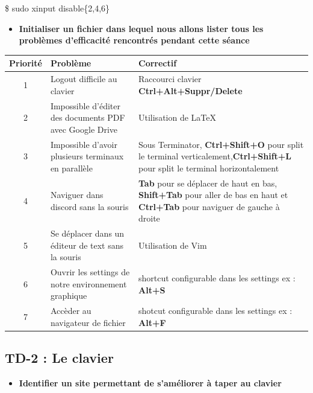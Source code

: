 \documentclass[12pt]{article}
\begin{document}
  \vspace{0.3cm}
  \$ sudo xinput disable\{2,4,6\}
  \vspace{0.3cm}

  \begin{itemize}
    \item \textbf{Initialiser un fichier dans lequel nous allons lister tous les problèmes d'efficacité rencontrés pendant cette séance}
  \end{itemize}
  \vspace{0.3cm}

  \begin{tabular}{|c|p{5cm}|p{10cm}|}
    \hline
    \textbf{Priorité} & \textbf{Problème} & \textbf{Correctif}\\
    \hline
    1 & Logout difficile au clavier & Raccourci clavier \textbf{Ctrl+Alt+Suppr/Delete}\\
    \hline
    2 & Impossible d'éditer des documents PDF avec Google Drive & Utilisation de LaTeX\\
    \hline
    3 & Impossible d'avoir plusieurs terminaux en parallèle & Sous Terminator, \textbf{Ctrl+Shift+O} pour split le terminal verticalement,\newline \textbf{Ctrl+Shift+L} pour split le terminal horizontalement\\
    \hline
    4 & Naviguer dans discord sans la souris & \textbf{Tab} pour se déplacer de haut en bas, \textbf{Shift+Tab} pour aller de bas en haut \newline et \textbf{Ctrl+Tab} pour naviguer de gauche à droite\\
    \hline
    5 & Se déplacer dans un éditeur de text sans la souris & Utilisation de Vim\\
    \hline
    6 & Ouvrir les settings de notre environnement graphique & shortcut configurable dans les settings ex : \textbf{Alt+S}\\
    \hline
    7 & Accèder au navigateur de fichier & shotcut configurable dans les settings ex : \textbf{Alt+F}\\
    \hline
  \end{tabular}
\vspace{0.3cm}

	\subsection{TD-2 : Le clavier}
  \vspace{0.3cm}

  \begin{itemize}
	  \item \textbf{Identifier un site permettant de s'améliorer à taper au clavier}
  \end{itemize}
\end{document}
